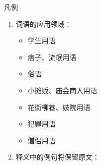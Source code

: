 
{\fontSCSansSec\Huge 凡例}

\begin{enumerate}
	\item 词语的应用领域：
	      \begin{itemize}
		      \item {}学生用语
		      \item {}痞子、流氓用语
		      \item {}俗语
		      \item {}小摊贩、庙会商人用语
		      \item {}花街柳巷、妓院用语
		      \item {}犯罪用语
		      \item {}僧侣用语
	      \end{itemize}
	\item 释义中的例句将保留原文：\\
\end{enumerate}


\clearpage
